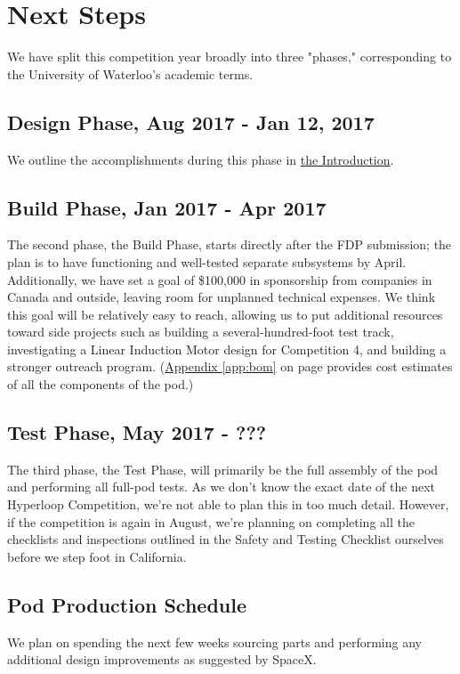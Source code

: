 \documentclass[main.tex]{subfiles}
\begin{document}
    \chapter{Next Steps}
    We have split this competition year broadly into three "phases," corresponding to the University of Waterloo's academic terms.
    
    \section{Design Phase, Aug 2017 - Jan 12, 2017}
    We outline the accomplishments during this phase in \hyperref[ch:intro]{the Introduction}.
    
    \section{Build Phase, Jan 2017 - Apr 2017}
    The second phase, the Build Phase, starts directly after the FDP submission; the plan is to have functioning and well-tested separate subsystems by April. Additionally, we have set a goal of \$100,000 in sponsorship from companies in Canada and outside, leaving room for unplanned technical expenses. We think this goal will be relatively easy to reach, allowing us to put additional resources toward side projects such as building a several-hundred-foot test track, investigating a Linear Induction Motor design for Competition 4, and building a stronger outreach program. (\hyperref[app:bom]{Appendix \ref{app:bom}} on page \pageref{app:bom} provides cost estimates of all the components of the pod.)
    
	\section{Test Phase, May 2017 - ???}
    The third phase, the Test Phase, will primarily be the full assembly of the pod and performing all full-pod tests. As we don't know the exact date of the next Hyperloop Competition, we're not able to plan this in too much detail. However, if the competition is again in August, we're planning on completing all the checklists and inspections outlined in the Safety and Testing Checklist ourselves before we step foot in California.
    
    \section{Pod Production Schedule}
    We plan on spending the next few weeks sourcing parts and performing any additional design improvements as suggested by SpaceX.
    
\end{document}
